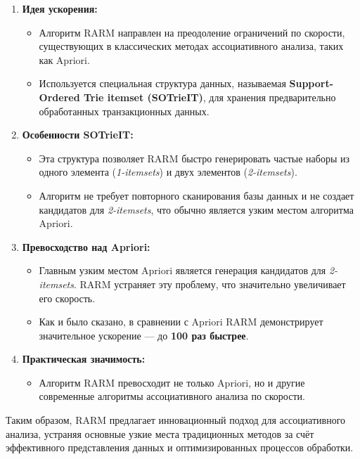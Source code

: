 \begin{enumerate}
    \item \textbf{Идея ускорения:}
          \begin{itemize}
              \item Алгоритм RARM направлен на преодоление ограничений по скорости, существующих в классических методах ассоциативного анализа, таких как Apriori.
              \item Используется специальная структура данных, называемая \textbf{Support-Ordered Trie itemset (SOTrieIT)}, для хранения предварительно обработанных транзакционных данных.
          \end{itemize}

    \item \textbf{Особенности SOTrieIT:}
          \begin{itemize}
              \item Эта структура позволяет RARM быстро генерировать частые наборы из одного элемента (\textit{1-itemsets}) и двух элементов (\textit{2-itemsets}).
              \item Алгоритм не требует повторного сканирования базы данных и не создает кандидатов для \textit{2-itemsets}, что обычно является узким местом алгоритма Apriori.
          \end{itemize}

    \item \textbf{Превосходство над Apriori:}
          \begin{itemize}
              \item Главным узким местом Apriori является генерация кандидатов для \textit{2-itemsets}. RARM устраняет эту проблему, что значительно увеличивает его скорость.
              \item Как и было сказано, в сравнении с Apriori RARM демонстрирует значительное ускорение --- до \textbf{100 раз быстрее}.
          \end{itemize}

    \item \textbf{Практическая значимость:}
          \begin{itemize}
              \item Алгоритм RARM превосходит не только Apriori, но и другие современные алгоритмы ассоциативного анализа по скорости.
          \end{itemize}
\end{enumerate}

Таким образом, RARM предлагает инновационный подход для ассоциативного анализа, устраняя основные узкие места традиционных методов за счёт эффективного представления данных и оптимизированных процессов обработки.

